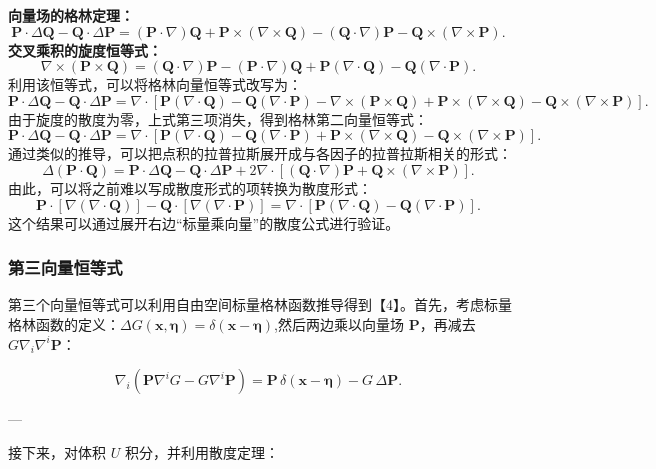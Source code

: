 \textbf{向量场的格林定理：}
$$
\mathbf{P} \cdot \Delta \mathbf{Q} - \mathbf{Q} \cdot \Delta \mathbf{P} =
(\mathbf{P} \cdot \nabla)\mathbf{Q} + \mathbf{P} \times (\nabla \times \mathbf{Q})
- (\mathbf{Q} \cdot \nabla)\mathbf{P} - \mathbf{Q} \times (\nabla \times \mathbf{P}).~
$$
\textbf{交叉乘积的旋度恒等式：}
$$
\nabla \times (\mathbf{P} \times \mathbf{Q}) =
(\mathbf{Q} \cdot \nabla)\mathbf{P} - (\mathbf{P} \cdot \nabla)\mathbf{Q}
+ \mathbf{P}(\nabla \cdot \mathbf{Q}) - \mathbf{Q}(\nabla \cdot \mathbf{P}).~
$$
利用该恒等式，可以将格林向量恒等式改写为：
$$
\mathbf{P} \cdot \Delta \mathbf{Q} - \mathbf{Q} \cdot \Delta \mathbf{P} =
\nabla \cdot
\left[
\mathbf{P}(\nabla \cdot \mathbf{Q}) - \mathbf{Q}(\nabla \cdot \mathbf{P})
- \nabla \times (\mathbf{P} \times \mathbf{Q})
+ \mathbf{P} \times (\nabla \times \mathbf{Q})
- \mathbf{Q} \times (\nabla \times \mathbf{P})
\right].~
$$
由于旋度的散度为零，上式第三项消失，得到格林第二向量恒等式：
$$
\mathbf{P} \cdot \Delta \mathbf{Q} - \mathbf{Q} \cdot \Delta \mathbf{P} =
\nabla \cdot
\left[
\mathbf{P}(\nabla \cdot \mathbf{Q}) - \mathbf{Q}(\nabla \cdot \mathbf{P})
+ \mathbf{P} \times (\nabla \times \mathbf{Q})
- \mathbf{Q} \times (\nabla \times \mathbf{P})
\right].~
$$
通过类似的推导，可以把点积的拉普拉斯展开成与各因子的拉普拉斯相关的形式：
$$
\Delta (\mathbf{P} \cdot \mathbf{Q}) =
\mathbf{P} \cdot \Delta \mathbf{Q} - \mathbf{Q} \cdot \Delta \mathbf{P}
+ 2 \nabla \cdot
\left[
(\mathbf{Q} \cdot \nabla)\mathbf{P}
+ \mathbf{Q} \times (\nabla \times \mathbf{P})
\right].~
$$
由此，可以将之前难以写成散度形式的项转换为散度形式：
$$
\mathbf{P} \cdot [\nabla(\nabla \cdot \mathbf{Q})] -
\mathbf{Q} \cdot [\nabla(\nabla \cdot \mathbf{P})]
=
\nabla \cdot
\left[
\mathbf{P}(\nabla \cdot \mathbf{Q}) -
\mathbf{Q}(\nabla \cdot \mathbf{P})
\right].~
$$
这个结果可以通过展开右边“标量乘向量”的散度公式进行验证。
\subsubsection{第三向量恒等式}
第三个向量恒等式可以利用自由空间标量格林函数推导得到【4】。首先，考虑标量格林函数的定义：$\Delta G(\mathbf{x}, \boldsymbol{\eta}) = \delta(\mathbf{x} - \boldsymbol{\eta})$,然后两边乘以向量场 $\mathbf{P}$，再减去 $G \nabla_i \nabla^i \mathbf{P}$：

$$
\nabla_i\left(\mathbf{P} \nabla^i G - G \nabla^i \mathbf{P}\right)
= \mathbf{P} \,\delta(\mathbf{x} - \boldsymbol{\eta}) - G \,\Delta \mathbf{P}.~
$$

---

接下来，对体积 $U$ 积分，并利用散度定理：

